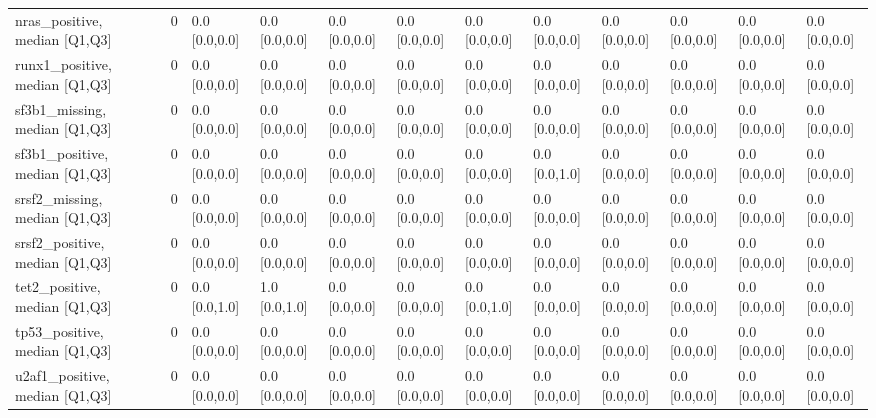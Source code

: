 \begin{tabular}{lllllllllllll}
nras\_positive, median [Q1,Q3] &    &                    0 &       0.0 [0.0,0.0] &      0.0 [0.0,0.0] &        0.0 [0.0,0.0] &       0.0 [0.0,0.0] &     0.0 [0.0,0.0] &     0.0 [0.0,0.0] &     0.0 [0.0,0.0] &        0.0 [0.0,0.0] &       0.0 [0.0,0.0] &        0.0 [0.0,0.0] \\
runx1\_positive, median [Q1,Q3] &    &                    0 &       0.0 [0.0,0.0] &      0.0 [0.0,0.0] &        0.0 [0.0,0.0] &       0.0 [0.0,0.0] &     0.0 [0.0,0.0] &     0.0 [0.0,0.0] &     0.0 [0.0,0.0] &        0.0 [0.0,0.0] &       0.0 [0.0,0.0] &        0.0 [0.0,0.0] \\
sf3b1\_missing, median [Q1,Q3] &    &                    0 &       0.0 [0.0,0.0] &      0.0 [0.0,0.0] &        0.0 [0.0,0.0] &       0.0 [0.0,0.0] &     0.0 [0.0,0.0] &     0.0 [0.0,0.0] &     0.0 [0.0,0.0] &        0.0 [0.0,0.0] &       0.0 [0.0,0.0] &        0.0 [0.0,0.0] \\
sf3b1\_positive, median [Q1,Q3] &    &                    0 &       0.0 [0.0,0.0] &      0.0 [0.0,0.0] &        0.0 [0.0,0.0] &       0.0 [0.0,0.0] &     0.0 [0.0,0.0] &     0.0 [0.0,1.0] &     0.0 [0.0,0.0] &        0.0 [0.0,0.0] &       0.0 [0.0,0.0] &        0.0 [0.0,0.0] \\
srsf2\_missing, median [Q1,Q3] &    &                    0 &       0.0 [0.0,0.0] &      0.0 [0.0,0.0] &        0.0 [0.0,0.0] &       0.0 [0.0,0.0] &     0.0 [0.0,0.0] &     0.0 [0.0,0.0] &     0.0 [0.0,0.0] &        0.0 [0.0,0.0] &       0.0 [0.0,0.0] &        0.0 [0.0,0.0] \\
srsf2\_positive, median [Q1,Q3] &    &                    0 &       0.0 [0.0,0.0] &      0.0 [0.0,0.0] &        0.0 [0.0,0.0] &       0.0 [0.0,0.0] &     0.0 [0.0,0.0] &     0.0 [0.0,0.0] &     0.0 [0.0,0.0] &        0.0 [0.0,0.0] &       0.0 [0.0,0.0] &        0.0 [0.0,0.0] \\
tet2\_positive, median [Q1,Q3] &    &                    0 &       0.0 [0.0,1.0] &      1.0 [0.0,1.0] &        0.0 [0.0,0.0] &       0.0 [0.0,0.0] &     0.0 [0.0,1.0] &     0.0 [0.0,0.0] &     0.0 [0.0,0.0] &        0.0 [0.0,0.0] &       0.0 [0.0,0.0] &        0.0 [0.0,0.0] \\
tp53\_positive, median [Q1,Q3] &    &                    0 &       0.0 [0.0,0.0] &      0.0 [0.0,0.0] &        0.0 [0.0,0.0] &       0.0 [0.0,0.0] &     0.0 [0.0,0.0] &     0.0 [0.0,0.0] &     0.0 [0.0,0.0] &        0.0 [0.0,0.0] &       0.0 [0.0,0.0] &        0.0 [0.0,0.0] \\
u2af1\_positive, median [Q1,Q3] &    &                    0 &       0.0 [0.0,0.0] &      0.0 [0.0,0.0] &        0.0 [0.0,0.0] &       0.0 [0.0,0.0] &     0.0 [0.0,0.0] &     0.0 [0.0,0.0] &     0.0 [0.0,0.0] &        0.0 [0.0,0.0] &       0.0 [0.0,0.0] &        0.0 [0.0,0.0] \\

\end{tabular}
